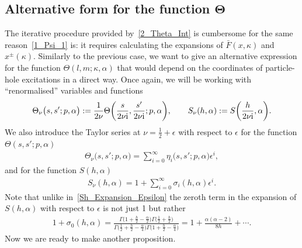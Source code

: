 \documentclass[pdftex]{sigma}
\numberwithin{equation}{section}
\begin{document}
\subsection[Alternative form for the function Theta]{Alternative form for the function $\boldsymbol{\Theta}$}
The iterative procedure provided by~\eqref{2_Theta_Int} is cumbersome for the same reason~\eqref{1_Psi_1} is: it requires calculating the expansions of $\bar{F}(x, \kappa)$ and $x^{\pm}(\kappa)$. Similarly to the previous case, we want to give an alternative expression for the function $\Theta(l, m; \kappa, \alpha)$ that would depend on the coordinates of particle-hole excitations in a direct way. Once again, we will be working with ``renormalised'' variables and functions
\begin{align*}
\Theta_\nu\bigl(s, s'; p, \alpha\bigr):=\frac{1}{2\nu} \Theta\biggl(\frac{s}{2\nu {\rm i}}, \frac{s'}{2\nu {\rm i}}; p, \alpha\biggr),
\qquad
 S_\nu(h, \alpha):=S\biggl(\frac{h}{2\nu {\rm i}}, \alpha\biggr).
\end{align*}
We also introduce the Taylor series at $\nu=\frac{1}{2}+\epsilon$ with respect to $\epsilon$ for the function $\Theta(s, s'; p, \alpha)$
\begin{align*}
\Theta_\nu \bigl(s, s'; p, \alpha\bigr)=\sum_{i=0}^{\infty} \eta_i\bigl(s, s'; p, \alpha\bigr) \epsilon^i,
\end{align*}
and for the function $S(h, \alpha)$
\begin{align*}
S_\nu(h, \alpha)=1+\sum_{i=0}^{\infty} \sigma_i(h, \alpha) \epsilon^i.
\end{align*}
Note that unlike in~\eqref{Sh_Expansion_Epsilon} the zeroth term in the expansion of $S(h, \alpha)$ with respect to $\epsilon$ is not just 1 but rather
\begin{align*}
1+\sigma_0(h, \alpha)=\frac{\Gamma\bigl(1+\frac{h}{2}-\frac{\alpha}{2}\bigr) \Gamma\bigl(\frac{1}{2}+\frac{h}{2}\bigr)}{\Gamma\bigl(\frac{1}{2}+\frac{h}{2}-\frac{\alpha}{4}\bigr) \Gamma\bigl(1+\frac{h}{2}-\frac{\alpha}{4}\bigr)}=
1+\frac{\alpha(\alpha-2)}{8h}+\cdots.
\end{align*}
Now we are ready to make another proposition.
\end{document}
